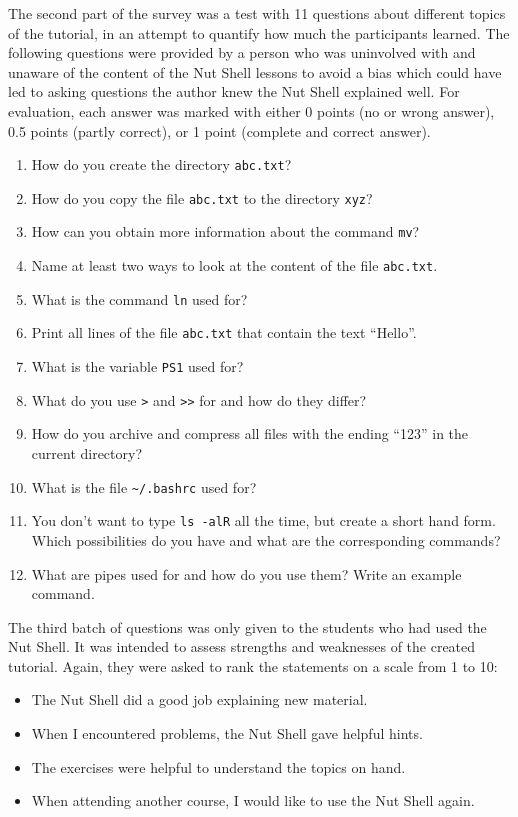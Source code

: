 \documentclass[paper=a4,abstract=on,cleardoublepage=empty,numbers=noenddot,toc=bib,12pt,appendixprefix=true]{scrreprt}
\begin{document}
The second part of the survey was a test with 11 questions about different topics of the tutorial, in an attempt to quantify how much the participants learned. The following questions were provided by a person who was uninvolved with and unaware of the content of the Nut Shell lessons to avoid a bias which could have led to asking questions the author knew the Nut Shell explained well. For evaluation, each answer was marked with either 0 points (no or wrong answer), 0.5 points (partly correct), or 1 point (complete and correct answer).

\begin{enumerate}
    \item How do you create the directory \texttt{abc.txt}?
    \item How do you copy the file \texttt{abc.txt} to the directory \texttt{xyz}?
    \item How can you obtain more information about the command \texttt{mv}?
    \item Name at least two ways to look at the content of the file \texttt{abc.txt}.
    \item What is the command \texttt{ln} used for?
    \item Print all lines of the file \texttt{abc.txt} that contain the text “Hello”.
    \item What is the variable \texttt{PS1} used for?
    \item What do you use \texttt{>} and \texttt{>>} for and how do they differ?
    \item How do you archive and compress all files with the ending “123” in the current directory?
    \item What is the file \texttt{\textasciitilde/.bashrc} used for?
    \item You don't want to type \texttt{ls -alR} all the time, but create a short hand form. Which possibilities do you have and what are the corresponding commands?
    \item What are pipes used for and how do you use them? Write an example command.
\end{enumerate}

The third batch of questions was only given to the students who had used the Nut Shell. It was intended to assess strengths and weaknesses of the created tutorial. Again, they were asked to rank the statements on a scale from 1 to 10:

\begin{itemize}
    \item The Nut Shell did a good job explaining new material.
    \item When I encountered problems, the Nut Shell gave helpful hints.
    \item The exercises were helpful to understand the topics on hand.
    \item When attending another course, I would like to use the Nut Shell again.
\end{itemize}
\end{document}
